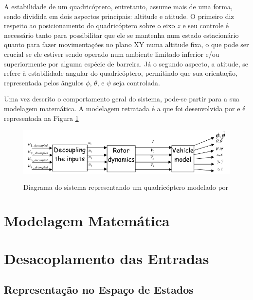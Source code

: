 A estabilidade de um quadricóptero, entretanto, assume mais de uma forma, sendo dividida em dois aspectos principais: altitude e atitude. O primeiro diz respeito ao posicionamento do quadricóptero sobre o eixo $z$ e seu controle é necessário tanto para possibilitar que ele se mantenha num estado estacionário quanto para fazer movimentações no plano XY numa altitude fixa, o que pode ser crucial se ele estiver sendo operado num ambiente limitado inferior e/ou superiormente por alguma espécie de barreira. Já o segundo aspecto, a atitude, se refere à estabilidade angular do quadricóptero, permitindo que sua orientação, representada pelos ângulos $\phi$, $\theta$, e $\psi$ seja controlada.

Uma vez descrito o comportamento geral do sistema, pode-se partir para a sua modelagem matemática. A modelagem retratada é a que foi desenvolvida por  e é representada na Figura \ref{fig:diagrama-quadrotor-balas}

\begin{figure}[!htb]
    \centering
    \caption{Diagrama do sistema representando um quadricóptero modelado por }
    \includegraphics[width=1\textwidth]{./04-figuras/sistemas-nao-lineares/diagrama-quadrotor}
    \label{fig:diagrama-quadrotor-balas}
\end{figure}

\section{Modelagem Matemática}
\label{sec:dinamica-rotores}



\section{Desacoplamento das Entradas}
\label{sec:desacoplamento}



%
%


\subsection{Representação no Espaço de Estados}
\label{subsec:quadrotor-ss}


